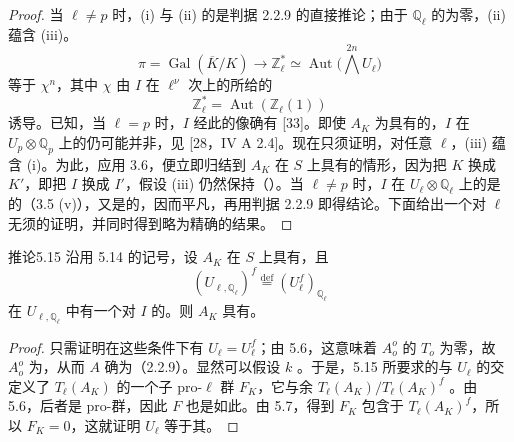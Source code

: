 \begin{proof}
当 $\ell\ne p$ 时，(i) 与 (ii) 的是判据 2.2.9 的直接推论；由于 $\mathbb Q_\ell$ 的为零，(ii) 蕴含 (iii)。
\[
\pi=\operatorname{Gal}(\overline K/K)\longrightarrow\mathbb Z_\ell^*
\simeq\operatorname{Aut}\bigl(\textstyle\bigwedge^{2n}U_\ell\bigr)
\]
等于 $\chi^n$，其中 $\chi$ 由
$ I$ 在 $\ell^\nu$ 次上的所给的
\[
\mathbb Z_\ell^*=\operatorname{Aut}(\mathbb Z_\ell(1))
\]
诱导。已知，当 $\ell=p$ 时，$I$ 经此的像确有 [33]。即使 $A_K$ 为具有的，$I$ 在 $U_p\otimes\mathbb Q_p$ 上的仍可能并非，见 [28，IV A 2.4]。现在只须证明，对任意 $\ell$，(iii) 蕴含 (i)。为此，应用 3.6，便立即归结到 $A_K$ 在 $S$ 上具有的情形，因为把 $K$ 换成 $K'$，即把 $I$ 换成 $I'$，假设 (iii) 仍然保持（）。当 $\ell\ne p$ 时，$I$ 在 $U_\ell\otimes\mathbb Q_\ell$ 上的是的（3.5 (v)），又是的，因而平凡，再用判据 2.2.9 即得结论。下面给出一个对 $\ell$ 无须的证明，并同时得到略为精确的结果。
\end{proof}

\begin{SGAresult}{推论}{5.15}
沿用 5.14 的记号，设 $A_K$ 在 $S$ 上具有，且
\[
(U_{\ell,\mathbb Q_\ell})^f\overset{\mathrm{def}}=(U_\ell^f)_{\mathbb Q_\ell}
\]
在 $U_{\ell,\mathbb Q_\ell}$ 中有一个对 $I$ 的。则 $A_K$ 具有。
\end{SGAresult}
\begin{proof}
只需证明在这些条件下有 $U_\ell=U_\ell^f$；由 5.6，这意味着 $A_o^o$ 的 $T_o$ 为零，故 $A_o^o$ 为，从而 $A$ 确为（2.2.9）。显然可以假设 $k$ 。于是，5.15 所要求的与 $U_\ell$ 的交
定义了 $T_\ell(A_K)$ 的一个子 pro-$\ell$ 群 $F_K$，它与余 $T_\ell(A_K)/T_\ell(A_K)^f$ 。由 5.6，后者是 pro-群，因此 $F$ 也是如此。由 5.7，得到 $F_K$ 包含于 $T_\ell(A_K)^f$，所以 $F_K=0$，这就证明 $U_\ell$ 等于其。
\end{proof}

